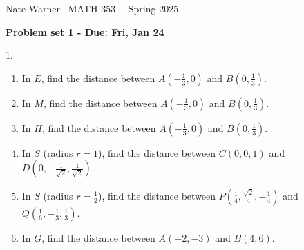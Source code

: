 \documentclass{report}
\title{\Huge{}}
\author{\huge{Nathan Warner}}
\date{\huge{}}
\begin{document}
    \pagebreak \bigbreak \noindent
    Nate Warner \ \quad \quad \quad \quad \quad \quad \quad \quad \quad \quad \quad \quad  MATH 353 \quad  \quad \quad \quad \quad \quad \quad \quad \quad \ \ \quad \quad Spring 2025
    \begin{center}
        \textbf{Problem set 1 - Due: Fri, Jan 24}
    \end{center}
    \bigbreak \noindent 
    \begin{mdframed}
        1. \begin{enumerate}[label=(\alph*)]
            \item In $E$, find the distance between $A\left(-\frac{1}{3}, 0\right)$ and $B\left(0, \frac{1}{3}\right)$.
            \item In $M$, find the distance between $A\left(-\frac{1}{3}, 0\right)$ and $B\left(0, \frac{1}{3}\right)$.
            \item In $H$, find the distance between $A\left(-\frac{1}{3}, 0\right)$ and $B\left(0, \frac{1}{3}\right)$.
            \item In $S$ (radius $r = 1$), find the distance between $C\left(0, 0, 1\right)$ and $D\left(0, -\frac{1}{\sqrt{2}}, \frac{1}{\sqrt{2}}\right)$.
            \item In $S$ (radius $r = \frac{1}{2}$), find the distance between 
                $P\left(\frac{1}{4}, \frac{\sqrt{2}}{4}, -\frac{1}{4}\right)$ and $Q\left(\frac{1}{6}, -\frac{1}{3}, \frac{1}{3}\right)$.
            \item In $G$, find the distance between $A(-2, -3)$ and $B(4, 6)$.
        \end{enumerate}
    \end{mdframed}
\end{document}
